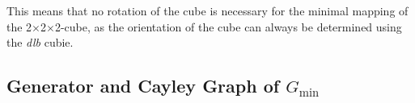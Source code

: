 \documentclass[12pt,a4paper]{article}
\theoremstyle{custom}
\newtheorem*{proofcustom}{Proof}
\newcommand{\Gtwo}{\ensuremath{G_{2\times 2\times 2}}}
\newcommand{\Ttwo}{2$\times$2$\times$2-}
\begin{document}
This means that no rotation of the cube is necessary for the minimal mapping of the \Ttwo cube, as the orientation of the cube can always be determined using the \textit{dlb} cubie.













\subsection{Generator and Cayley Graph of $G_\text{min}$}
\label{section_CayleygraphMIN}
\end{document}
